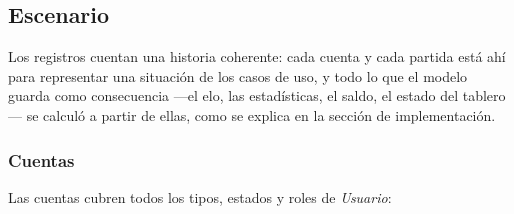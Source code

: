 \subsection*{Escenario}

Los registros cuentan una historia coherente: cada cuenta y cada partida está ahí para representar una situación de los casos de uso, y todo lo que el modelo guarda como consecuencia ---el elo, las estadísticas, el saldo, el estado del tablero--- se calculó a partir de ellas, como se explica en la sección de implementación.

\subsubsection*{Cuentas}

Las \dpNumUsuarios{} cuentas cubren todos los tipos, estados y roles de \textit{Usuario}:

